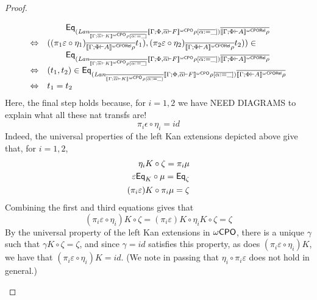 \documentclass[acmsmall,review,anonymous]{acmart}
\theoremstyle{definition}
\renewcommand{\id}{\mathit{id}}
\begin{document}
\begin{proof}
\begin{itemize}
\[\begin{array}{ll}
 & \hspace*{0.3in}\mathsf{Eq}_{(\textit{Lan}_{\overline{\llbracket{\Gamma; \overline{\alpha}
      \vdash K}\rrbracket^{{\omega\mathsf{CPO}}}\rho[\overline{\alpha := \_}]}} \llbracket{\Gamma; \Phi,
  \overline{\alpha} \vdash F}\rrbracket^{{\omega\mathsf{CPO}}}\rho[\overline{\alpha := \_}]) \overline{\llbracket{\Gamma;
    \Phi \vdash A}\rrbracket^{{\omega\mathsf{CPORel}}}\rho}}\\
\Leftrightarrow & ((\pi_1 \varepsilon \circ
\eta_1)_{\overline{\llbracket{\Gamma;\Phi \vdash 
      A}\rrbracket^{{\omega\mathsf{CPORel}}}\rho}} t_1), (\pi_2 \varepsilon \circ
\eta_2)_{\overline{\llbracket{\Gamma;\Phi \vdash A}\rrbracket^{{\omega\mathsf{CPORel}}} \rho}} t_2)) \in\\
 & \hspace*{0.3in}\mathsf{Eq}_{(\textit{Lan}_{\overline{\llbracket{\Gamma; \overline{\alpha}
      \vdash K}\rrbracket^{{\omega\mathsf{CPO}}}\rho[\overline{\alpha := \_}]}} \llbracket{\Gamma; \Phi,
  \overline{\alpha} \vdash F}\rrbracket^{{\omega\mathsf{CPO}}}\rho[\overline{\alpha := \_}]) \overline{\llbracket{\Gamma;
    \Phi \vdash A}\rrbracket^{{\omega\mathsf{CPORel}}}\rho}}\\
\Leftrightarrow & (t_1, t_2) \in
 \mathsf{Eq}_{(\textit{Lan}_{\overline{\llbracket{\Gamma; \overline{\alpha} 
      \vdash K}\rrbracket^{{\omega\mathsf{CPO}}}\rho[\overline{\alpha := \_}]}} \llbracket{\Gamma; \Phi,
  \overline{\alpha} \vdash F}\rrbracket^{{\omega\mathsf{CPO}}}\rho[\overline{\alpha := \_}]) \overline{\llbracket{\Gamma;
    \Phi \vdash A}\rrbracket^{{\omega\mathsf{CPORel}}}\rho}}\\
\Leftrightarrow & t_1 = t_2
\end{array}\]
Here, the final step holds because, for $i = 1,2$ we have {\color{blue}
  NEED DIAGRAMS to explain what all these nat transfs are!} 
\[ \pi_i \epsilon  \circ \eta_i = \id\]
Indeed, the universal properties of the left Kan extensions depicted
above give that, for $i = 1,2$,
\begin{eqnarray*}
\eta_i K \circ \zeta = \pi_i \mu\\
\varepsilon \mathsf{Eq}_K \circ \mu = \mathsf{Eq}_\zeta\\
(\pi_i \varepsilon) K \circ \pi_i \mu = \zeta
\end{eqnarray*}
Combining the first and third equations gives that
\[ (\pi_i \varepsilon \circ \eta_i) K \circ \zeta = 
(\pi_i \varepsilon) K \circ \eta_i K \circ \zeta = \zeta\] By the
universal property of the left Kan extensions in {\color{red}
  ${\omega\mathsf{CPO}}$}, there is a unique $\gamma$ such that $\gamma K \circ \zeta
= \zeta$, and since $\gamma = \id$ satisfies this property, as does
$(\pi_i \varepsilon \circ \eta_i) K$, we have that $(\pi_i \varepsilon
\circ \eta_i) K = \id$. (We note in passing that $\eta_i \circ \pi_i
\varepsilon$ does not hold in general.)
\end{itemize}
\end{proof}
\end{document}
